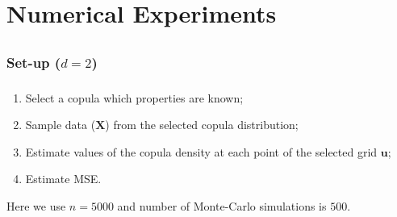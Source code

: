 \documentclass[aspectratio=169]{beamer}
\begin{document}
\section{Numerical Experiments}
	\subsection{}
		\subsubsection{Set-up ($ d=2 $)}
			\begin{frame}
				\frametitle{\insertsubsubsection}
				
				\begin{enumerate}
					\item Select a copula which properties are known;
					\item Sample data ($ \mathbf{X} $) from the selected copula distribution;
					\item Estimate values of the copula density at each point of the selected grid $ \mathbf{u} $;
					\item Estimate MSE.\\[1em]
				\end{enumerate}
				
				Here we use $ n=5000 $ and number of Monte-Carlo simulations is $ 500 $.
			
			\end{frame}
			
\end{document}
